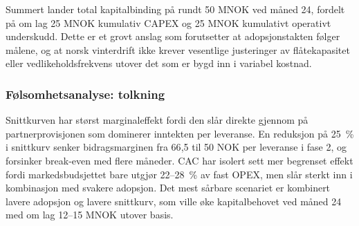 Summert lander total kapitalbinding på rundt 50 MNOK ved måned 24,
fordelt på om lag 25 MNOK kumulativ CAPEX og 25 MNOK kumulativt
operativt underskudd. Dette er et grovt anslag som forutsetter at
adopsjons\-takten følger målene, og at norsk vinterdrift ikke krever
vesentlige justeringer av flåtekapasitet eller vedlikeholds\-frekvens
utover det som er bygd inn i variabel kostnad.

\subsubsection{Følsomhetsanalyse: tolkning}
\label{app:sensitivitet}

Snittkurven har størst marginal\-effekt fordi den slår direkte gjennom
på partner\-provisjonen som dominerer inntekten per leveranse. En
reduksjon på 25~\% i snittkurv senker bidrags\-marginen fra 66{,}5 til
50 NOK per leveranse i fase 2, og forsinker break-even med flere
måneder. CAC har isolert sett mer begrenset effekt fordi
markedsbudsjettet bare utgjør 22--28~\% av fast OPEX, men slår sterkt
inn i kombinasjon med svakere adopsjon. Det mest sårbare scenariet er
kombinert lavere adopsjon og lavere snittkurv, som ville øke
kapitalbehovet ved måned 24 med om lag 12--15 MNOK utover basis.
